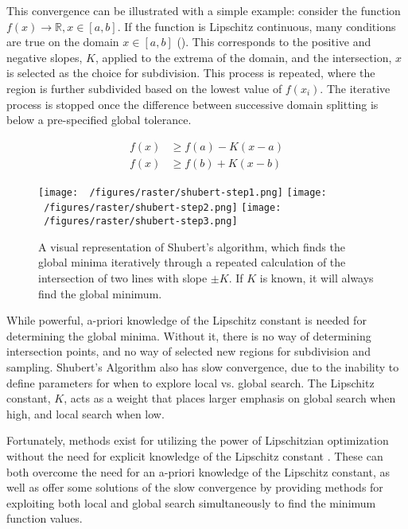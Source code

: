 This convergence can be illustrated with a simple example: consider the function $f(x) \rightarrow \mathbb{R}, x \in [a,b]$.
If the function is Lipschitz continuous, many conditions are true on the domain $x\in[a,b]$ ().
This corresponds to the positive and negative slopes, $K$, applied to the extrema of the domain, and the intersection, $x$ is selected as the choice for subdivision.
This process is repeated, where the region is further subdivided based on the lowest value of $f(x_i)$.
The iterative process is stopped once the difference between successive domain splitting is below a pre-specified global tolerance.

\begin{equation}
    \begin{aligned}
        f(x) &\ge f(a) - K(x - a) \\
        f(x) &\ge f(b) + K(x - b)
    \end{aligned}
    \label{eq:shubert}
\end{equation}

\begin{figure}
    \begin{center}
        \texttt{[image: ~/figures/raster/shubert-step1.png]}
        \vspace{3mm}
        \texttt{[image: ~/figures/raster/shubert-step2.png]}
        \vspace{3mm}
        \texttt{[image: ~/figures/raster/shubert-step3.png]}
    \end{center}
    \label{fig:shubert}
    \caption{A visual representation of Shubert's algorithm, which finds the global minima iteratively through a repeated calculation of the intersection of two lines with slope $\pm K$. If $K$ is known, it will always find the global minimum.}
\end{figure}

While powerful, a-priori knowledge of the Lipschitz constant is needed for determining the global minima.
Without it, there is no way of determining intersection points, and no way of selected new regions for subdivision and sampling.
Shubert's Algorithm also has slow convergence, due to the inability to define parameters for when to explore local vs. global search.
The Lipschitz constant, $K$, acts as a weight that places larger emphasis on global search when high, and local search when low.

Fortunately, methods exist for utilizing the power of Lipschitzian optimization without the need for explicit knowledge of the Lipschitz constant \cite{jonesLipschitzianOptimizationLipschitz1993,stripinisNewDIRECTGLhAlgorithm2021,stripinisDGONewDIRECTtype2021}.
These can both overcome the need for an a-priori knowledge of the Lipschitz constant, as well as offer some solutions of the slow convergence by providing methods for exploiting both local and global search simultaneously to find the minimum function values.

